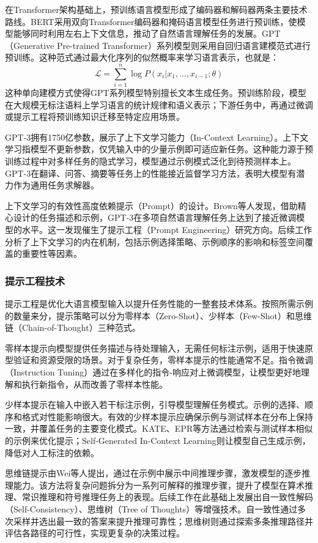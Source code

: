 在Transformer架构基础上，预训练语言模型形成了编码器和解码器两条主要技术路线。BERT采用双向Transformer编码器和掩码语言模型任务进行预训练，使模型能够同时利用左右上下文信息，推动了自然语言理解任务的发展\cite{devlin2019bert}。GPT（Generative Pre-trained Transformer）系列模型则采用自回归语言建模范式进行预训练。这种范式通过最大化序列的似然概率来学习语言表示，也就是：
\begin{equation}
\mathcal{L} = \sum_{i=1}^{n} \log P(x_i | x_1, ..., x_{i-1}; \theta)
\end{equation}
这种单向建模方式使得GPT系列模型特别擅长文本生成任务。预训练阶段，模型在大规模无标注语料上学习语言的统计规律和语义表示；下游任务中，再通过微调或提示工程将预训练知识迁移至特定应用场景。

GPT-3拥有1750亿参数，展示了上下文学习能力（In-Context Learning）\cite{brown2020gpt3}。上下文学习指模型不更新参数，仅凭输入中的少量示例即可适应新任务。这种能力源于预训练过程中对多样任务的隐式学习，模型通过示例模式泛化到待预测样本上。GPT-3在翻译、问答、摘要等任务上的性能接近监督学习方法，表明大模型有潜力作为通用任务求解器。

上下文学习的有效性高度依赖提示（Prompt）的设计。Brown等人发现，借助精心设计的任务描述和示例，GPT-3在多项自然语言理解任务上达到了接近微调模型的水平。这一发现催生了提示工程（Prompt Engineering）研究方向。后续工作分析了上下文学习的内在机制，包括示例选择策略、示例顺序的影响和标签空间覆盖的重要性等因素。

\subsubsection{提示工程技术}

提示工程是优化大语言模型输入以提升任务性能的一整套技术体系。按照所需示例的数量来分，提示策略可以分为零样本（Zero-Shot）、少样本（Few-Shot）和思维链（Chain-of-Thought）三种范式。

零样本提示向模型提供任务描述与待处理输入，无需任何标注示例，适用于快速原型验证和资源受限的场景。对于复杂任务，零样本提示的性能通常不足。指令微调（Instruction Tuning）通过在多样化的指令-响应对上微调模型，让模型更好地理解和执行新指令，从而改善了零样本性能。

少样本提示在输入中嵌入若干标注示例，引导模型理解任务模式。示例的选择、顺序和格式对性能影响很大。有效的少样本提示应确保示例与测试样本在分布上保持一致，并覆盖任务的主要变化模式。KATE、EPR等方法通过检索与测试样本相似的示例来优化提示；Self-Generated In-Context Learning则让模型自己生成示例，降低对人工标注的依赖。

思维链提示由Wei等人提出，通过在示例中展示中间推理步骤，激发模型的逐步推理能力。该方法将复杂问题拆分为一系列可解释的推理步骤，提升了模型在算术推理、常识推理和符号推理任务上的表现。后续工作在此基础上发展出自一致性解码（Self-Consistency）、思维树（Tree of Thoughts）等增强技术。自一致性通过多次采样并选出最一致的答案来提升推理可靠性；思维树则通过探索多条推理路径并评估各路径的可行性，实现更复杂的决策过程。

